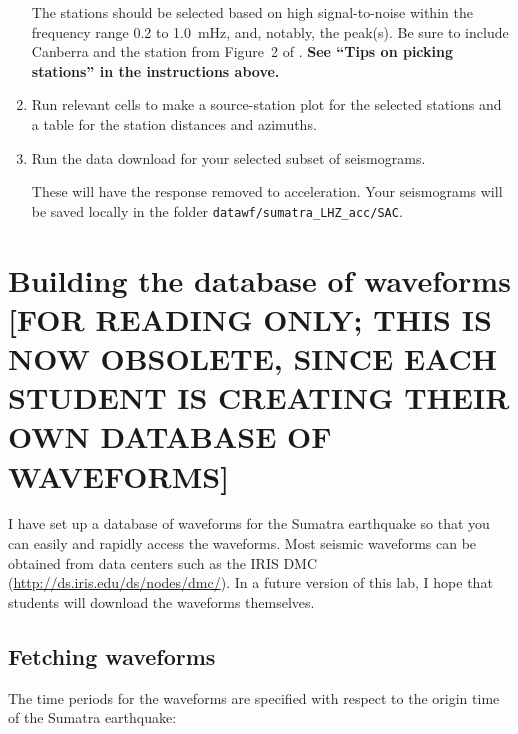 \documentclass[11pt,titlepage,fleqn]{article}
\begin{document}
\begin{enumerate}
%
%
The stations should be selected based on high signal-to-noise within the frequency range 0.2 to 1.0~mHz, and, notably, the  peak(s). Be sure to include Canberra and the station from Figure~2 of \citet{Park2005}.
{\bf See ``Tips on picking stations'' in the instructions above.}

\item Run relevant cells to make a source-station plot for the selected stations and a table for the station distances and azimuths.

\item Run the data download for your selected subset of seismograms.

These will have the response removed to acceleration. Your seismograms will be saved locally in the folder \verb+datawf/sumatra_LHZ_acc/SAC+.

\end{enumerate}


\iffalse

\section{Building the database of waveforms [FOR READING ONLY; THIS IS NOW OBSOLETE, SINCE EACH STUDENT IS CREATING THEIR OWN DATABASE OF WAVEFORMS]}

I have set up a database of waveforms for the Sumatra earthquake so that you can easily and rapidly access the waveforms. Most seismic waveforms can be obtained from data centers such as the IRIS DMC (\url{http://ds.iris.edu/ds/nodes/dmc/}). In a future version of this lab, I hope that students will download the waveforms themselves.

\subsection{Fetching waveforms}

\medskip\noindent
The time periods for the waveforms are specified with respect to the origin time of the Sumatra earthquake:
\end{document}
